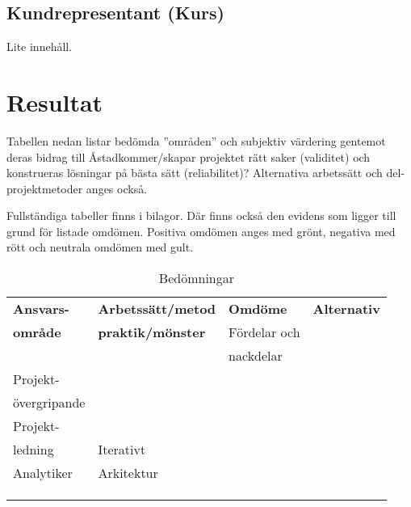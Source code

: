\documentclass[conference]{IEEEtran}
\begin{document}
\subsection{Kundrepresentant (Kurs)}
Lite innehåll.

\section{Resultat}
Tabellen nedan listar bedömda ”områden” och subjektiv värdering gentemot deras bidrag 
till Åstadkommer/skapar projektet rätt saker (validitet) och konstrueras lösningar på 
bästa sätt (reliabilitet)? Alternativa arbetssätt och del-projektmetoder anges också.

Fullständiga tabeller finns i bilagor. Där finns också den evidens som ligger till 
grund för listade omdömen. Positiva omdömen anges med grönt, negativa med rött och 
neutrala omdömen med gult. 

\begin{table}[htbp]
\caption{Bedömningar}
\begin{center}
\begin{tabular}{|l|l|l|l|}
\hline
\textbf{Ansvars-}   & \textbf{Arbetssätt/metod}     & \textbf{Omdöme}       & \textbf{Alternativ} \\
\textbf{område}     & \textbf{praktik/mönster}      & Fördelar och          & \\
                    &                               & nackdelar             &  \\
\hline
Projekt-            &                               &                       & \\
övergripande        &                               &                       & \\
\hline
Projekt-            &                               &                       & \\
ledning             & Iterativt                     & \cellcolor{green}     & \\
\hline
Analytiker          & Arkitektur                    &                       & \\
\hline
                    &                               & \cellcolor{pink}      & \\
\hline
                    &                               & \cellcolor{yellow}    & \\
\hline
                    &                               &                       & \\
\hline
\end{tabular}
\label{tab1}
\end{center}
\end{table}
\end{document}
